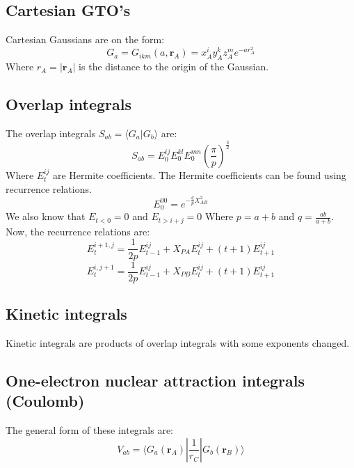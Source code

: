 \documentclass[a4paper,10pt, twocolumn, pre]{revtex4}
\newcommand{\rvec}{\mathbf{r}}
\newcommand{\overlap}[2]{\langle {#1}|{#2} \rangle}
\newcommand{\sandwich}[3]{\langle {#1}|{#2}|{#3}\rangle}
\begin{document}
\subsection{Cartesian GTO's}
Cartesian Gaussians are on the form:
\begin{equation}
	G_a = G_{ikm}(a, \rvec_A) = x^i_A y^k_A z^m_A e^{-ar^2_A}
	\label{eq:gaussianprimitive}
\end{equation}
Where $r_A = |\rvec_A|$ is the distance to the origin of the Gaussian.


\subsection{Overlap integrals}
The overlap integrals $S_{ab} = \overlap{G_a}{G_b}$ are:
\begin{equation}
	S_{ab} = E_0^{ij}E_0^{kl}E_0^{mn}\left(\frac{\pi}{p}\right)^{\frac{3}{2}}
\end{equation}
Where $E_t^{ij}$ are Hermite coefficients. 
The Hermite coefficients can be found using recurrence relations. 
\begin{equation}
	E_0^{00} = e^{-\frac{q}{p}X_{AB}^2}
\end{equation}
We also know that $E_{t<0} = 0$ and $E_{t>i+j} = 0$
Where $p = a+b$ and $q = \frac{ab}{a+b}$.
Now, the recurrence relations are:
\begin{equation}
	E_t^{i+1,j} = \frac{1}{2p}E_{t-1}^{ij} + X_{PA}E_t^{ij} + (t+1) E_{t+1}^{ij}
\end{equation}
\begin{equation}
	E_t^{i, j+1} = \frac{1}{2p}E_{t-1}^{ij}+X_{PB}E_t^{ij} + (t+1)E_{t+1}^{ij}
\end{equation}

\subsection{Kinetic integrals}

Kinetic integrals are products of overlap integrals with some exponents changed.

\subsection{One-electron nuclear attraction integrals (Coulomb)}
The general form of these integrals are:
\begin{equation}
	V_{ab} = \sandwich{G_a(\rvec_A)}{\frac{1}{r_C}}{G_b(\rvec_B)}
\end{equation}
\end{document}
